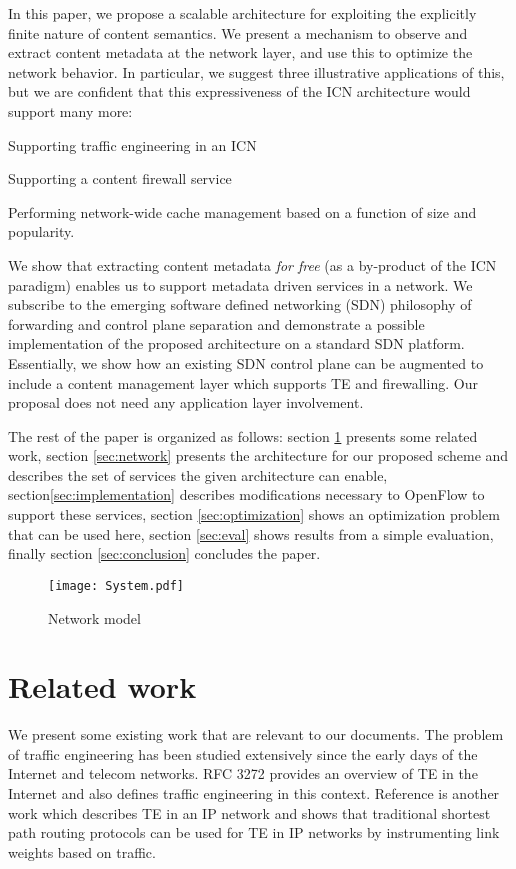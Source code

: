 \documentclass[conference]{IEEEtran}
\begin{document}
In this paper, we propose a scalable architecture for exploiting
the explicitly finite nature of content semantics. We present
a mechanism to observe and extract content metadata at the
network layer, and use this to optimize the network behavior.
In particular, we suggest three illustrative applications of this,
but we are confident that this expressiveness of the ICN
architecture would support many more:
\begin{inparaenum}
\item Supporting traffic engineering in an ICN
\item Supporting a content firewall service
\item Performing network-wide cache management based on a
function of size and popularity.
\end{inparaenum}
We show that extracting
content metadata \emph{for free} (as a by-product of the ICN
paradigm) enables us to support metadata driven services in
a network. We subscribe to the emerging software defined
networking (SDN) \cite{nick08} philosophy of forwarding and control
plane separation and demonstrate a possible implementation
of the proposed architecture on a standard SDN platform.
Essentially, we show how an existing SDN control plane can
be augmented to include a content management layer which
supports TE and firewalling. Our proposal does not need any
application layer involvement.


The rest of the paper is organized as follows: section \ref{sec:related} presents some related work, section \ref{sec:network} presents the architecture for our proposed scheme and describes the set of services the given architecture can enable, section\ref{sec:implementation} describes modifications necessary to OpenFlow to support these services, section \ref{sec:optimization} shows an optimization problem that can be used here, section \ref{sec:eval} shows results from a simple evaluation, finally section \ref{sec:conclusion} concludes the paper.

\begin{figure}
\centering
\vspace{-30pt}
\texttt{[image: System.pdf]}
\caption{Network model}
\label{fig:network}
\end{figure}

\section{Related work}
\label{sec:related}
We present some existing work that are relevant to our
documents. The problem of traffic engineering has been
studied extensively since the early days of the Internet and
telecom networks. RFC 3272 provides an overview of TE in
the Internet \cite{Awduche02} and also defines traffic engineering in this
context. Reference \cite{Fortz02} is another work which describes TE in
an IP network and shows that traditional shortest path routing protocols can be used for TE in IP networks by instrumenting
link weights based on traffic.
\end{document}
